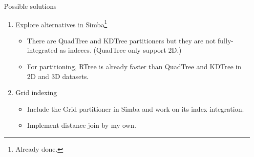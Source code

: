 \documentclass{beamer}
\theoremstyle{definition}
\begin{document}
\begin{frame}{Possible solutions}
    \begin{enumerate}
        \item Explore alternatives in Simba\footnote{Already done.}
        \begin{itemize}
            \item There are QuadTree and KDTree partitioners but they are not fully-integrated as indeces. (QuadTree only support 2D.)
            \item For partitioning, RTree is already faster than QuadTree and KDTree in 2D and 3D datasets.   
        \end{itemize}

        \item Grid indexing
        \begin{itemize}
            \item Include the Grid partitioner in Simba and work on its index integration.
            \item Implement distance join by my own.
        \end{itemize}

    \end{enumerate}
\end{frame}
\end{document}
